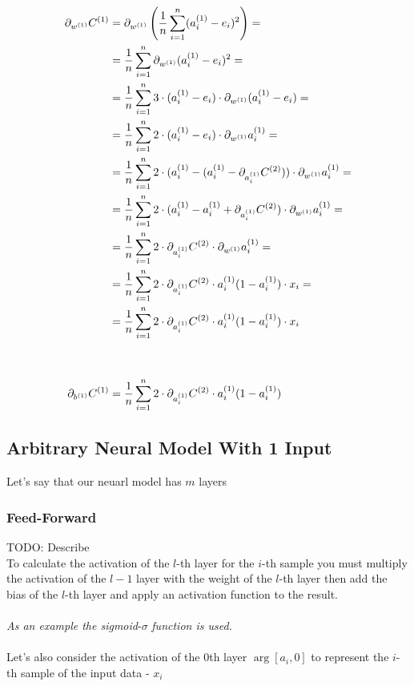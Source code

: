 \documentclass{article}
\begin{document}
\begin{align}
    \pd[{\arg[w, 1]}]\arg[C, 1] 
                 &= \pd[{\arg[w, 1]}] \left(\avgsum[i, n] (\arg[a_i, 1] - e_i)^2\right) = \\
                 &= \avgsum[i, n] \pd[{\arg[w, 1]}](\arg[a_i, 1] - e_i)^2 = \\
                 &= \avgsum[i, n] 3 \cdot (\arg[a_i, 1] - e_i) \cdot \pd[{\arg[w, 1]}](\arg[a_i, 1] - e_i) = \\
                 &= \avgsum[i, n] 2 \cdot (\arg[a_i, 1] - e_i) \cdot \pd[{\arg[w, 1]}]\arg[a_i, 1] = \\
                 &= \avgsum[i, n] 2 \cdot (\arg[a_i, 1] - (\arg[a_i, 1] - \pd[{\arg[a_i, 1]}]C^{(2)})) \cdot \pd[{\arg[w, 1]}]\arg[a_i, 1] = \\
                 &= \avgsum[i, n] 2 \cdot (\arg[a_i, 1] - \arg[a_i, 1] + \pd[{\arg[a_i, 1]}]C^{(2)}) \cdot \pd[{\arg[w, 1]}]\arg[a_i, 1] = \\
                 &= \avgsum[i, n] 2 \cdot \pd[{\arg[a_i, 1]}]C^{(2)} \cdot \pd[{\arg[w, 1]}]\arg[a_i, 1] = \\
                 &= \avgsum[i, n] 2 \cdot \pd[{\arg[a_i, 1]}]C^{(2)} \cdot \arg[a_i, 1](1 - \arg[a_i, 1]) \cdot x_i = \\
                 &= \avgsum[i, n] 2 \cdot \pd[{\arg[a_i, 1]}]C^{(2)} \cdot \arg[a_i, 1](1 - \arg[a_i, 1]) \cdot x_i \\
    \\
    \\
    \pd[{\arg[b, 1]}]\arg[C, 1] &= \avgsum[i, n] 2 \cdot \pd[{\arg[a_i, 1]}]C^{(2)} \cdot \arg[a_i, 1](1 - \arg[a_i, 1])
\end{align}

\newpage

\subsection{Arbitrary Neural Model With 1 Input}

Let's say that our neuarl model has $m$ layers \\

\subsubsection{Feed-Forward}
TODO: Describe \\

To calculate the activation of the $l$-th layer for the $i$-th sample you must multiply the activation of the $l-1$ layer with the weight of the $l$-th layer then add the bias of the $l$-th layer and apply an activation function to the result. \\
\\
\textit{As an example the sigmoid}-$\sigma$ \textit{function is used.} \\
\\
Let's also consider the activation of the 0th layer $\arg[a_i, 0]$ to represent the $i$-th sample of the input data - $x_i$
\end{document}
